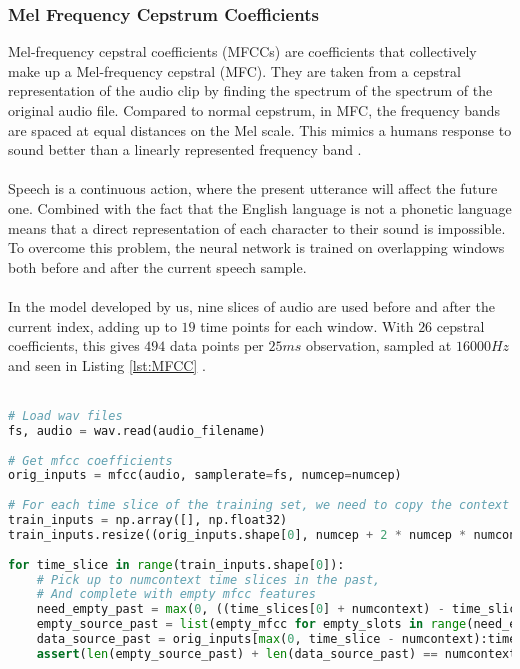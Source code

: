 \subsubsection{Mel Frequency Cepstrum Coefficients}
Mel-frequency cepstral coefficients (MFCCs) are coefficients that collectively make up a Mel-frequency cepstral (MFC). 
They are taken from a cepstral representation of the audio clip by finding the spectrum of the spectrum of the original audio file.
 Compared to normal cepstrum, in MFC, the frequency bands are spaced at equal distances on the Mel scale.
 This mimics a humans response to sound better than a linearly represented frequency band \cite{sahidullah2012design}.\\\\
Speech is a continuous action, where the present utterance will affect the future one. Combined with the fact that the English language is not a phonetic language means that a direct
representation of each character to their sound is impossible. To overcome this problem, the neural network is trained on overlapping windows both before and after the current speech sample.\\\\
In the model developed by us, nine slices of audio are used before and after the current index, adding up to $19$ time points for each window. With $26$ cepstral coefficients, this gives $494$ data points per $25ms$ observation, sampled at $16 000 Hz$ and seen in Listing \ref{lst:MFCC} .\\\

\begin{lstlisting}[language = Python, flexiblecolumns=true, label=lst:MFCC, caption = Example code to obtain MFCC features \cite{rubashkin2017}.]
# Load wav files
fs, audio = wav.read(audio_filename)
 
# Get mfcc coefficients
orig_inputs = mfcc(audio, samplerate=fs, numcep=numcep)
 
# For each time slice of the training set, we need to copy the context this makes
train_inputs = np.array([], np.float32)
train_inputs.resize((orig_inputs.shape[0], numcep + 2 * numcep * numcontext))
 
for time_slice in range(train_inputs.shape[0]):
    # Pick up to numcontext time slices in the past,
    # And complete with empty mfcc features
    need_empty_past = max(0, ((time_slices[0] + numcontext) - time_slice))
    empty_source_past = list(empty_mfcc for empty_slots in range(need_empty_past))
    data_source_past = orig_inputs[max(0, time_slice - numcontext):time_slice]
    assert(len(empty_source_past) + len(data_source_past) == numcontext)
\end{lstlisting}
 

